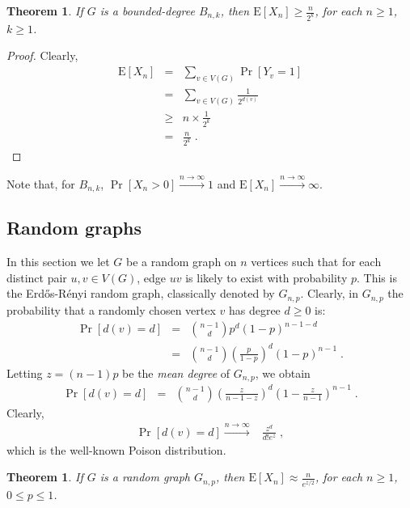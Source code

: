 \documentclass{article}
\newcommand{\tendingtoinfty}[1]{\stackrel{#1 \rightarrow \infty}{\longrightarrow}}
\newtheorem{thm}[lem]{Theorem}
\begin{document}
\begin{thm}
\label{EXBn}
If $G$ is a bounded-degree $B_{n, k}$, then
$\mathrm{E}[X_n] \geq \frac{n}{2^k}$, for each $n \geq 1$, $k \geq 1$.
\end{thm}
\begin{proof}
Clearly, 
\begin{eqnarray*}
	 \mathrm{E}[X_n] & = & \sum_{v \in V(G)} \Pr[Y_v = 1] \\
				     & = & \sum_{v \in V(G)} \frac{1}{2^{d(v)}} \\
					 & \geq & n \times \frac{1}{2^k} \\
					 & = & \frac{n}{2^k} \;{.} 
\end{eqnarray*}
\end{proof}

Note that, for $B_{n, k}$, $\Pr[X_n > 0] \tendingtoinfty{n} 1$ and
$\mathrm{E}[X_n] \tendingtoinfty{n} \infty$.

\subsection{Random graphs}

In this section we let $G$ be a random graph on $n$ vertices such that for each
distinct pair $u, v \in V(G)$, edge $uv$ is likely to exist with probability
$p$. This is the Erd\H{o}s-R\'{e}nyi random graph, classically denoted by
$G_{n,p}$. Clearly, in $G_{n,p}$ the probability that a randomly chosen vertex
$v$ has degree $d \geq 0$ is:
\begin{eqnarray*}
	 \Pr[d(v) = d] & = & \binom{n-1}{d} p^d (1-p)^{n-1-d} \\
			       & = & \binom{n-1}{d} \left( \frac{p}{1-p} \right)^d (1-p)^{n-1} \;{.}
\end{eqnarray*}
Letting $z = (n-1)p$ be the \emph{mean degree} of $G_{n,p}$, we obtain
\begin{eqnarray*}
	 \Pr[d(v) = d] & = & \binom{n-1}{d} \left( \frac{z}{n-1-z} \right)^d \left(1-\frac{z}{n-1}\right)^{n-1} \;{.}
\end{eqnarray*}
Clearly, 
\begin{eqnarray*}
	 \Pr[d(v) = d] \tendingtoinfty{n} & \frac{z^d}{d! e^z} \;{,} 
\end{eqnarray*}
which is the well-known Poison distribution.
	
\begin{thm}
\label{EXGnp}
If $G$ is a random graph $G_{n, p}$, then $\mathrm{E}[X_n] \approx \frac{n}{e^{z/2}}$, for each $n \geq 1$, $0 \leq p \leq 1$.
\end{thm}
\end{document}
